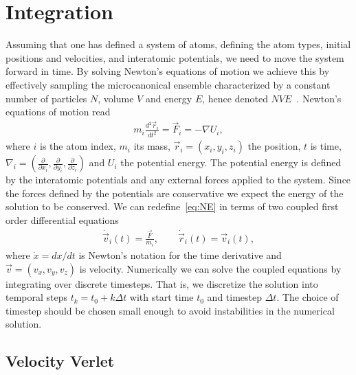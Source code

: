 \section{Integration}\label{sec:integration}
Assuming that one has defined a system of atoms, defining the atom types, initial positions and velocities, and interatomic potentials, we need
to move the system forward in time. By solving Newton's equations of motion we achieve this by effectively sampling the microcanonical ensemble characterized by a constant number of particles $N$, volume $V$ and energy $E$, hence denoted $NVE$~\cite{dfrenkel96:mc}. Newton's equations of motion read
\begin{align}
  m_i \frac{d^2 \vec{r}_i}{dt^2} = \vec{F}_i = -\nabla U_i,
  \label{eq:NE}
\end{align}
where $i$ is the atom index, $m_i$ its mass, $\vec{r}_i = (x_i, y_i,
z_i)$ the position, $t$ is time, $\nabla_i = (\frac{\partial}{\partial x_i},
\frac{\partial}{\partial y_i}, \frac{\partial}{\partial z_i})$ and $U_i$ the
potential energy. The potential energy is defined by the interatomic potentials and any external forces applied to the system. Since the forces defined by the potentials are conservative we expect the energy of the solution
to be conserved. We can redefine~\cref{eq:NE} in terms of two coupled first
order differential equations 
\begin{align}
  \dot{\vec{v}}_i(t) = \frac{\vec{F}}{m_i}, \qquad \dot{\vec{r}}_i(t) = \vec{v}_i(t),
  \label{eq:NE_2}
\end{align}
where $\dot{x} = dx/dt$ is Newton's notation for the time derivative and $\vec{v} = (v_x,v_y,v_z)$ is velocity. Numerically we can solve the coupled equations by integrating over discrete timesteps. That is, we discretize the solution into temporal steps $t_k = t_0 + k\Delta t$ with start time $t_0$ and timestep $\Delta t$. The choice of timestep should be chosen small enough to avoid instabilities in the numerical solution.


\subsection{Velocity Verlet}

